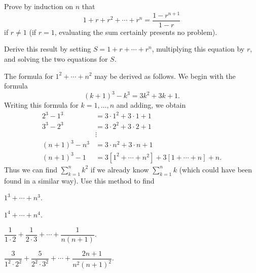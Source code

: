 \begin{letters}
\item Prove by induction on $n$ that
\[ 1 + r + r^2 + \cdots + r^n = \frac{1 - r^{n+1}}{1 - r} \]
if $r \neq 1$ (if $r = 1$, evaluating the sum certainly presents no problem).
\item Derive this result by setting $S = 1 + r + \cdots + r^n$, multiplying
  this equation by $r$, and solving the two equations for $S$.
\end{letters}

 The formula for $1^2 + \cdots + n^2$ may be derived as follows. We
begin with the formula
\[ (k+1)^3 - k^3 = 3k^2 + 3k + 1. \]
Writing this formula for $k = 1, \dots, n$ and adding, we obtain
\begin{align*}
2^3 - 1^3 &= 3 \cdot 1^2 + 3 \cdot 1 + 1\\
3^3 - 2^3 &= 3 \cdot 2^2 + 3 \cdot 2 + 1\\
&\vdots\\
(n+1)^3 - n^3 &= 3 \cdot n^2 + 3 \cdot n + 1\\
(n+1)^3 - 1 &= 3[1^2 + \cdots + n^2] + 3[1 + \cdots + n] + n.
\end{align*}
Thus we can find $\sum_{k=1}^{n} k^2$ if we already know $\sum_{k=1}^{n} k$
(which could have been found in a similar way). Use this method to find
\begin{romans}
\item $1^3 + \cdots + n^3$.
\item $1^4 + \cdots + n^4$.
\item $\dfrac{1}{1\cdot 2} + \dfrac{1}{2\cdot 3} + \cdots + \dfrac{1}{n(n+1)}$.
\item $\dfrac{3}{1^2 \cdot 2^2} + \dfrac{5}{2^2 \cdot 3^2} + \cdots +
  \dfrac{2n+1}{n^2(n+1)^2}$.
\end{romans}

